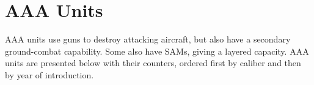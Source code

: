 




\chapter{AAA Units}

AAA units use guns to destroy attacking aircraft, but also have a secondary ground-combat capability. Some also have SAMs, giving a layered capacity. AAA units are presented below with their counters, ordered first by caliber and then by year of introduction.


